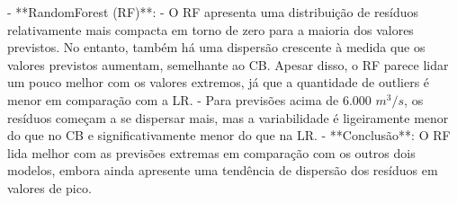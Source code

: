 - **RandomForest (RF)**:
- O RF apresenta uma distribuição de resíduos relativamente mais compacta em torno de zero para a maioria dos valores previstos. No entanto, também há uma dispersão crescente à medida que os valores previstos aumentam, semelhante ao CB. Apesar disso, o RF parece lidar um pouco melhor com os valores extremos, já que a quantidade de outliers é menor em comparação com a LR.
- Para previsões acima de 6.000 \(m^3/s\), os resíduos começam a se dispersar mais, mas a variabilidade é ligeiramente menor do que no CB e significativamente menor do que na LR.
- **Conclusão**: O RF lida melhor com as previsões extremas em comparação com os outros dois modelos, embora ainda apresente uma tendência de dispersão dos resíduos em valores de pico.
%
%
%
%
%
%
